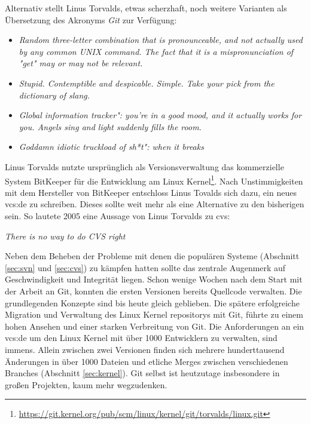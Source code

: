 Alternativ stellt Linus Torvalds, etwas scherzhaft, noch weitere Varianten als Übersetzung des
Akronyms \textit{Git} zur Verf\-ügung\cite{link:gitfaq}:

\begin{itemize}
  \item \textit{\glqq{}Random three-letter combination that is pronounceable, and not
  actually used by any common UNIX command. The fact that it is a
  mispronunciation of "get" may or may not be relevant.\grqq{}}
  \item \textit{\glqq{}Stupid. Contemptible and despicable. Simple. Take your pick from the
  dictionary of slang.\grqq{}}
  \item \textit{\glqq{}Global information tracker": you're in a good mood, and it actually
  works for you. Angels sing and light suddenly fills the room.\grqq{}}
  \item \textit{\glqq{}Goddamn idiotic truckload of sh*t": when it breaks\grqq{}}
\end{itemize}

Linus Torvalds nutzte ursprünglich als Versionsverwaltung das kommerzielle
System BitKeeper für die Entwicklung am Linux
Kernel\footnote{\url{https://git.kernel.org/pub/scm/linux/kernel/git/torvalds/linux.git}}.
Nach Unstimmigkeiten mit dem Hersteller von BitKeeper entschloss Linus Tovalds
sich dazu, ein neues \gls{vcs:de} zu schreiben. Dieses sollte weit mehr als
eine Alternative zu den bisherigen sein\cite[S.~13]{gitosp}. So lautete 2005
eine Aussage von Linus Torvalds zu \acrshort{cvs}\cite[S.~385]{cd}:

\begin{center}
\textit{\glqq{}There is no way to do CVS right\grqq{}}\\
\end{center}

Neben dem Beheben der Probleme mit denen die populären Systeme (Abschnitt
\ref{sec:svn} und \ref{sec:cvs}) zu kämpfen hatten sollte das zentrale
Augenmerk auf Geschwindigkeit und Integrität liegen. Schon wenige Wochen nach
dem Start mit der Arbeit an Git, konnten die ersten Versionen bereits Quellcode
verwalten. Die grundlegenden Konzepte sind bis heute gleich geblieben. Die
spätere erfolgreiche Migration und Verwaltung des Linux Kernel
\glspl{repository} mit Git, führte zu einem hohen Ansehen und einer starken
Verbreitung von Git. Die Anforderungen an ein \acrlong{vcs:de} um den Linux Kernel
mit über 1000 Entwicklern zu verwalten, sind immens. Allein zwischen zwei
Versionen finden sich mehrere hunderttausend Änderungen in über 1000 Dateien
und etliche Merges zwischen verschiedenen Branches (Abschnitt
\ref{sec:kernel}). Git selbst ist heutzutage insbesondere in großen Projekten,
kaum mehr wegzudenken.\cite[S.~13]{gitosp}

